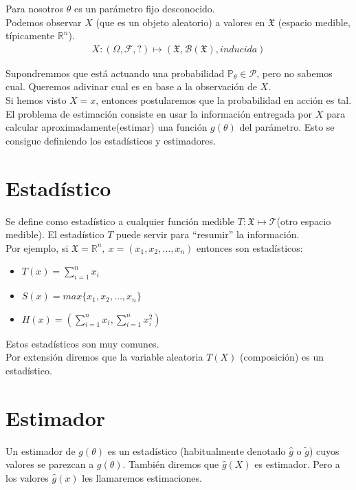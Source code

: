 \documentclass[10pt]{article}
\theoremstyle{plain}
\theoremstyle{definition}
\begin{document}
Para nosotros $\theta$ es un parámetro fijo desconocido.\\
Podemos observar $X$ (que es un objeto aleatorio) a valores en $\mathfrak{X}$ (espacio medible, típicamente $\mathbb{R}^n$).
\begin{align*}
X \colon (\Omega, \mathcal{F}, ?) \mapsto (\mathfrak{X}, \mathcal{B}(\mathfrak{X}), inducida)
\end{align*}

Supondremmos que está actuando una probabilidad $\mathbb{P}_{\theta} \in \mathcal{P}$, pero no sabemos cual. Queremos adivinar cual es en base a la observación de $X$.\\

Si hemos visto $X=x$, entonces postularemos que la probabilidad en acción es tal.\\

El problema de estimación consiste en usar la información entregada por $X$ para calcular aproximadamente(estimar) una función $g(\theta)$ del parámetro. Esto se consigue definiendo los estadísticos y estimadores.

\section{Estadístico}
Se define como estadístico a cualquier función medible $T: \mathfrak{X} \mapsto \mathcal{T}$(otro espacio medible).
El estadístico $T$ puede servir para ``resumir'' la información.\\

Por ejemplo, si $\mathfrak{X} = \mathbb{R}^n,\ x = (x_{1}, x_{2}, \ldots, x_{n})$ entonces son estadísticos:
\begin{itemize}
\item $T(x) = \sum_{i=1}^n{x_{i}}$
\item $S(x) = max\{x_{1}, x_{2}, \ldots, x_{n}\}$
\item $H(x) = \left(\sum_{i=1}^n{x_{i}}, \sum_{i=1}^n{x_{i}^2}\right)$
\end{itemize}
Estos estadísticos son muy comunes.\\

Por extensión diremos que la variable aleatoria $T(X)$ (composición) es un estadístico.

\section{Estimador}
Un estimador de $g(\theta)$ es un estadístico (habitualmente denotado $\hat{g}$ o $\tilde{g}$)	cuyos valores se parezcan a $g(\theta)$. También diremos que $\hat{g}(X)$ es estimador. Pero a los valores $\hat{g}(x)$ les llamaremos estimaciones.
\end{document}
